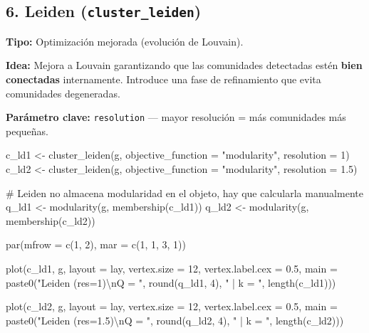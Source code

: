 \documentclass[
  letterpaper,
  DIV=11,
  numbers=noendperiod]{scrreprt}
\newenvironment{Shaded}{\begin{snugshade}}{\end{snugshade}}
\newcommand{\AttributeTok}[1]{\textcolor[rgb]{0.40,0.45,0.13}{#1}}
\newcommand{\CommentTok}[1]{\textcolor[rgb]{0.37,0.37,0.37}{#1}}
\newcommand{\DecValTok}[1]{\textcolor[rgb]{0.68,0.00,0.00}{#1}}
\newcommand{\FloatTok}[1]{\textcolor[rgb]{0.68,0.00,0.00}{#1}}
\newcommand{\FunctionTok}[1]{\textcolor[rgb]{0.28,0.35,0.67}{#1}}
\newcommand{\NormalTok}[1]{\textcolor[rgb]{0.00,0.23,0.31}{#1}}
\newcommand{\OtherTok}[1]{\textcolor[rgb]{0.00,0.23,0.31}{#1}}
\newcommand{\SpecialCharTok}[1]{\textcolor[rgb]{0.37,0.37,0.37}{#1}}
\newcommand{\StringTok}[1]{\textcolor[rgb]{0.13,0.47,0.30}{#1}}
\begin{document}
\subsection{\texorpdfstring{6. Leiden
(\texttt{cluster\_leiden})}{6. Leiden (cluster\_leiden)}}\label{leiden-cluster_leiden}

\textbf{Tipo:} Optimización mejorada (evolución de Louvain).

\textbf{Idea:} Mejora a Louvain garantizando que las comunidades
detectadas estén \textbf{bien conectadas} internamente. Introduce una
fase de refinamiento que evita comunidades degeneradas.

\textbf{Parámetro clave:} \texttt{resolution} --- mayor resolución = más
comunidades más pequeñas.

\begin{Shaded}
\begin{Highlighting}[]
\NormalTok{c\_ld1 }\OtherTok{\textless{}{-}} \FunctionTok{cluster\_leiden}\NormalTok{(g, }\AttributeTok{objective\_function =} \StringTok{"modularity"}\NormalTok{, }\AttributeTok{resolution =} \DecValTok{1}\NormalTok{)}
\NormalTok{c\_ld2 }\OtherTok{\textless{}{-}} \FunctionTok{cluster\_leiden}\NormalTok{(g, }\AttributeTok{objective\_function =} \StringTok{"modularity"}\NormalTok{, }\AttributeTok{resolution =} \FloatTok{1.5}\NormalTok{)}

\CommentTok{\# Leiden no almacena modularidad en el objeto, hay que calcularla manualmente}
\NormalTok{q\_ld1 }\OtherTok{\textless{}{-}} \FunctionTok{modularity}\NormalTok{(g, }\FunctionTok{membership}\NormalTok{(c\_ld1))}
\NormalTok{q\_ld2 }\OtherTok{\textless{}{-}} \FunctionTok{modularity}\NormalTok{(g, }\FunctionTok{membership}\NormalTok{(c\_ld2))}

\FunctionTok{par}\NormalTok{(}\AttributeTok{mfrow =} \FunctionTok{c}\NormalTok{(}\DecValTok{1}\NormalTok{, }\DecValTok{2}\NormalTok{), }\AttributeTok{mar =} \FunctionTok{c}\NormalTok{(}\DecValTok{1}\NormalTok{, }\DecValTok{1}\NormalTok{, }\DecValTok{3}\NormalTok{, }\DecValTok{1}\NormalTok{))}

\FunctionTok{plot}\NormalTok{(c\_ld1, g, }\AttributeTok{layout =}\NormalTok{ lay,}
     \AttributeTok{vertex.size =} \DecValTok{12}\NormalTok{, }\AttributeTok{vertex.label.cex =} \FloatTok{0.5}\NormalTok{,}
     \AttributeTok{main =} \FunctionTok{paste0}\NormalTok{(}\StringTok{"Leiden (res=1)}\SpecialCharTok{\textbackslash{}n}\StringTok{Q = "}\NormalTok{, }\FunctionTok{round}\NormalTok{(q\_ld1, }\DecValTok{4}\NormalTok{),}
                   \StringTok{" | k = "}\NormalTok{, }\FunctionTok{length}\NormalTok{(c\_ld1)))}

\FunctionTok{plot}\NormalTok{(c\_ld2, g, }\AttributeTok{layout =}\NormalTok{ lay,}
     \AttributeTok{vertex.size =} \DecValTok{12}\NormalTok{, }\AttributeTok{vertex.label.cex =} \FloatTok{0.5}\NormalTok{,}
     \AttributeTok{main =} \FunctionTok{paste0}\NormalTok{(}\StringTok{"Leiden (res=1.5)}\SpecialCharTok{\textbackslash{}n}\StringTok{Q = "}\NormalTok{, }\FunctionTok{round}\NormalTok{(q\_ld2, }\DecValTok{4}\NormalTok{),}
                   \StringTok{" | k = "}\NormalTok{, }\FunctionTok{length}\NormalTok{(c\_ld2)))}
\end{Highlighting}
\end{Shaded}
\end{document}
